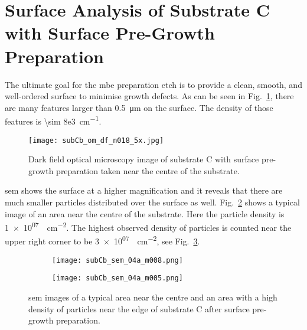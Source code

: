 \clearpage
\section[Surface Analysis of Substrate C with Surface Pre-Growth Preparation]{Surface Analysis of Substrate C with Surface Pre-Growth Preparation%
    }\label{sec:subCb}

The ultimate goal for the \ac{mbe} preparation etch is to provide a clean, smooth, and well-ordered surface to minimise growth defects. As can be seen in Fig.~\ref{fig:subCb_om_df}, there are many features larger than \SI{0.5}{\micro\metre} on the surface. The density of those features is \SI{\sim 8e3}{\centi\metre^{-1}}. 

\begin{figure}[htbp]
    \centering
    \texttt{[image: subCb\_om\_df\_n018\_5x.jpg]}
    \caption[Dark field optical microscopy image of substrate C with surface pre-growth preparation.]{Dark field optical microscopy image of substrate C with surface pre-growth preparation taken near the centre of the substrate.}\label{fig:subCb_om_df}
\end{figure}

\Ac{sem} shows the surface at a higher magnification and it reveals that there are much smaller particles distributed over the surface as well. Fig.~\ref{fig:subCb_sem_typical_centre} shows a typical image of an area near the centre of the substrate. Here the particle density is  \SI{1e+07}{\particle\centi\metre^{-2}}. The highest observed density of particles is counted near the upper right corner to be \SI{3e+07}{\particle\centi\metre^{-2}}, see Fig.~\ref{fig:subCb_sem_typical_corner}.

\begin{figure}[htbp]
    \begin{subfigure}[t]{0.49\textwidth}
        \texttt{[image: subCb\_sem\_04a\_m008.png]}
        \caption{}\label{fig:subCb_sem_typical_centre}
    \end{subfigure}%
    \hfill
    \begin{subfigure}[t]{0.49\textwidth}
        \texttt{[image: subCb\_sem\_04a\_m005.png]}
        \caption{}\label{fig:subCb_sem_typical_corner}
    \end{subfigure}%
    \caption[\Ac{sem} images of typical areas on substrate C with surface pre-growth preparation.]{\Acf{sem} images of  a typical area near the centre and  an area with a high density of particles near the edge of substrate C after surface pre-growth preparation.}\label{fig:subCb_sem_typical}
\end{figure}

